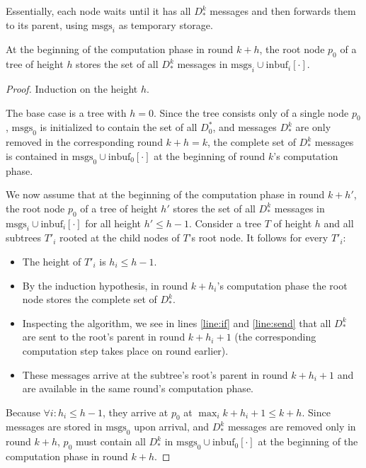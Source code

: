 Essentially, each node waits until it has all $D_*^k$ messages and
then forwards them to its parent, using $\text{msgs}_i$ as temporary storage.

\begin{lemma} \label{lem:tpipe}
At the beginning of the computation phase in round $k + h$,
the root node $p_0$ of a tree of height $h$
stores the set of all $D_*^k$ messages in $\text{msgs}_i \cup \text{inbuf}_i[\cdot]$.
\end{lemma}

\begin{proof}
Induction on the height $h$.

The base case is a tree with $h = 0$. Since the tree consists only of a single node $p_0$,
$\text{msgs}_0$ is initialized to contain the set of all $D_0^*$, 
and messages $D_*^k$ are only removed in the corresponding round $k + h = k$,
the complete set of $D_*^k$ messages is contained in 
$\text{msgs}_0 \cup \text{inbuf}_0[\cdot]$ at the beginning of round $k$'s computation phase.

We now assume that at the beginning of the computation phase in
round $k + h'$, the root node $p_0$ of a
tree of height $h'$ stores the set of all $D_*^k$ messages in
$\text{msgs}_i \cup \text{inbuf}_i[\cdot]$ for all height $h' \leq h - 1$.
Consider a tree $T$ of height $h$ and all subtrees $T'_i$ rooted at
the child nodes of $T$'s root node. It follows for every $T'_i$:

\begin{itemize}
\item The height of $T'_i$ is $h_i \leq h - 1$.
\item By the induction hypothesis, in round $k + h_i$'s computation phase the root node stores
      the complete set of $D_*^k$.
\item Inspecting the algorithm, we see in lines \ref{line:if} and \ref{line:send}
      that all $D_*^k$ are sent to the root's parent in round $k + h_i + 1$ (the
      corresponding computation step takes place on round earlier).
\item These messages arrive at the subtree's root's parent in round $k + h_i + 1$
      and are available in the same round's computation phase.
\end{itemize}

Because $\forall i: h_i \leq h - 1$, they arrive at $p_0$ at
$\max_i k + h_i + 1 \leq k + h$. Since messages are stored in $\text{msgs}_0$
upon arrival, and $D_*^k$ messages are removed only in round $k + h$,
$p_0$ must contain all $D_*^k$ in $\text{msgs}_0 \cup \text{inbuf}_0[\cdot]$
at the beginning of the computation phase in round $k + h$.
\end{proof}


